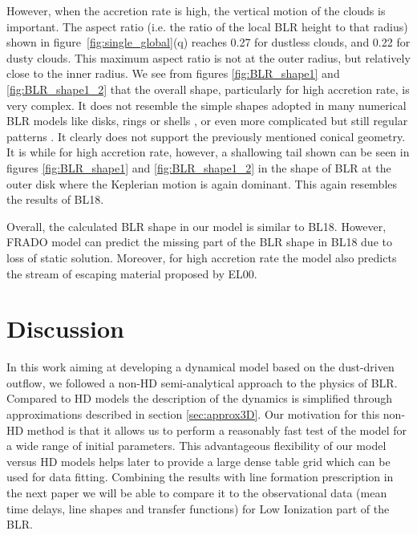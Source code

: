 \documentclass[twocolumn]{aastex62}
\begin{document}
However, when the accretion rate is high, the vertical motion of the clouds is important. The aspect ratio (i.e. the ratio of the local BLR height to that radius) shown in figure~\ref{fig:single_global}(q) reaches 0.27 for dustless clouds, and 0.22 for dusty clouds. This maximum aspect ratio is not at the outer radius, but relatively close to the inner radius. We see from figures \ref{fig:BLR_shape1} and \ref{fig:BLR_shape1_2} that the overall shape, particularly for high accretion rate, is very complex. It does not resemble the simple shapes adopted in many numerical BLR models like disks, rings or shells \citep{pancoast2011}, or even more complicated but still regular patterns \citep[e.g.][]{pancoast2014}. It clearly does not support the previously mentioned conical geometry.
It is while for high accretion rate, however, a shallowing tail shown can be seen in figures \ref{fig:BLR_shape1} and \ref{fig:BLR_shape1_2} in the shape of BLR at the outer disk where the Keplerian motion is again dominant. This again resembles the results of BL18.

Overall, the calculated BLR shape in our model is similar to BL18. However, FRADO model can predict the missing part of the BLR shape in BL18 due to loss of static solution. Moreover, for high accretion rate the model also predicts the stream of escaping material proposed by EL00.

\section{Discussion}
\label{sec:discussion}

In this work aiming at developing a dynamical model based on the dust-driven outflow, we followed a non-HD semi-analytical approach to the physics of BLR. Compared to HD models the description of the dynamics is simplified through approximations described in section \ref{sec:approx3D}. Our motivation for this non-HD method is that it allows us to perform a reasonably fast test of the model for a wide range of initial parameters. This advantageous flexibility of our model versus HD models helps later to provide a large dense table grid which can be used for data fitting. Combining the results with line formation prescription in the next paper we will be able to compare it to the observational data (mean time delays, line shapes and transfer functions) for Low Ionization part of the BLR.
\end{document}
